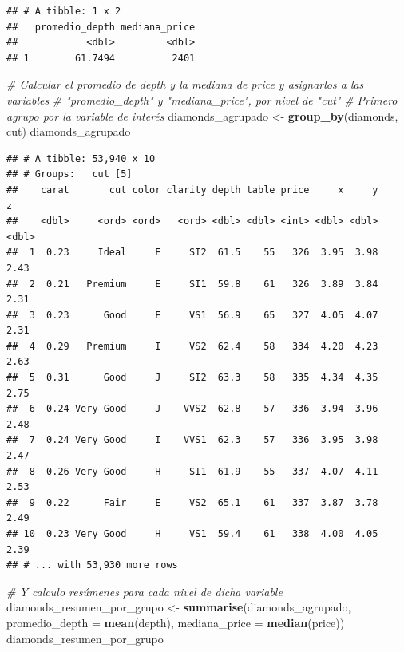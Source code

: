 \documentclass[]{book}
\newenvironment{Shaded}{\begin{snugshade}}{\end{snugshade}}
\newcommand{\KeywordTok}[1]{\textcolor[rgb]{0.13,0.29,0.53}{\textbf{#1}}}
\newcommand{\DataTypeTok}[1]{\textcolor[rgb]{0.13,0.29,0.53}{#1}}
\newcommand{\StringTok}[1]{\textcolor[rgb]{0.31,0.60,0.02}{#1}}
\newcommand{\CommentTok}[1]{\textcolor[rgb]{0.56,0.35,0.01}{\textit{#1}}}
\newcommand{\NormalTok}[1]{#1}
\theoremstyle{definition}
\theoremstyle{definition}
\theoremstyle{definition}
\theoremstyle{remark}
\begin{document}
\begin{verbatim}
## # A tibble: 1 x 2
##   promedio_depth mediana_price
##            <dbl>         <dbl>
## 1        61.7494          2401
\end{verbatim}

\begin{Shaded}
\begin{Highlighting}[]
\CommentTok{# Calcular el promedio de depth y la mediana de price y asignarlos a las variables}
\CommentTok{# "promedio_depth" y "mediana_price", por nivel de "cut"}
\CommentTok{# Primero agrupo por la variable de interés}
\NormalTok{diamonds_agrupado <-}\StringTok{ }\KeywordTok{group_by}\NormalTok{(diamonds, cut)}
\NormalTok{diamonds_agrupado}
\end{Highlighting}
\end{Shaded}

\begin{verbatim}
## # A tibble: 53,940 x 10
## # Groups:   cut [5]
##    carat       cut color clarity depth table price     x     y     z
##    <dbl>     <ord> <ord>   <ord> <dbl> <dbl> <int> <dbl> <dbl> <dbl>
##  1  0.23     Ideal     E     SI2  61.5    55   326  3.95  3.98  2.43
##  2  0.21   Premium     E     SI1  59.8    61   326  3.89  3.84  2.31
##  3  0.23      Good     E     VS1  56.9    65   327  4.05  4.07  2.31
##  4  0.29   Premium     I     VS2  62.4    58   334  4.20  4.23  2.63
##  5  0.31      Good     J     SI2  63.3    58   335  4.34  4.35  2.75
##  6  0.24 Very Good     J    VVS2  62.8    57   336  3.94  3.96  2.48
##  7  0.24 Very Good     I    VVS1  62.3    57   336  3.95  3.98  2.47
##  8  0.26 Very Good     H     SI1  61.9    55   337  4.07  4.11  2.53
##  9  0.22      Fair     E     VS2  65.1    61   337  3.87  3.78  2.49
## 10  0.23 Very Good     H     VS1  59.4    61   338  4.00  4.05  2.39
## # ... with 53,930 more rows
\end{verbatim}

\begin{Shaded}
\begin{Highlighting}[]
\CommentTok{# Y calculo resúmenes para cada nivel de dicha variable}
\NormalTok{diamonds_resumen_por_grupo <-}\StringTok{ }\KeywordTok{summarise}\NormalTok{(diamonds_agrupado, }\DataTypeTok{promedio_depth =} \KeywordTok{mean}\NormalTok{(depth), }\DataTypeTok{mediana_price =} \KeywordTok{median}\NormalTok{(price))}
\NormalTok{diamonds_resumen_por_grupo}
\end{Highlighting}
\end{Shaded}
\end{document}
